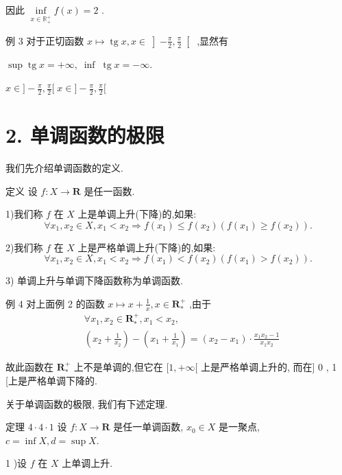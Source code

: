 因此 $\mathop{\inf }\limits_{{x \in  {\mathbb{R}}_{ + }^{ + }}}f\left( x\right)  = 2$ .

例 3 对于正切函数 $x \mapsto  \operatorname{tg}x,x \in  \left\rbrack  {-\frac{\pi }{2},\frac{\pi }{2}}\right\lbrack$ ,显然有

$\sup \operatorname{tg}x =  + \infty ,\;\inf \;\operatorname{tg}x =  - \infty .$

$x \in  \rbrack  - \frac{\pi }{2},\frac{\pi }{2}\lbrack \;x \in  \rbrack  - \frac{\pi }{2},\frac{\pi }{2}\lbrack$

\section*{2. 单调函数的极限}

我们先介绍单调函数的定义.

定义 设 $f : X \rightarrow  \mathbf{R}$ 是任一函数.

1)我们称 $f$ 在 $X$ 上是单调上升(下降)的,如果:
$$\forall {x}_{1},{x}_{2} \in  X,{x}_{1} < {x}_{2} \Rightarrow  f\left( {x}_{1}\right)  \leq  f\left( {x}_{2}\right) \left( {f\left( {x}_{1}\right)  \geq  f\left( {x}_{2}\right) }\right) .$$

2)我们称 $f$ 在 $X$ 上是严格单调上升(下降)的,如果:
$$\forall {x}_{1},{x}_{2} \in  X,{x}_{1} < {x}_{2} \Rightarrow  f\left( {x}_{1}\right)  < f\left( {x}_{2}\right) \left( {f\left( {x}_{1}\right)  > f\left( {x}_{2}\right) }\right) .$$

3) 单调上升与单调下降函数称为单调函数.

例 4 对上面例 2 的函数 $x \mapsto  x + \frac{1}{x},x \in  {\mathbf{R}}_{ * }^{ + }$ ,由于
\begin{align*}
	&\forall {x}_{1},{x}_{2} \in  {\mathbf{R}}_{ * }^{ + },{x}_{1} < {x}_{2},\\
	&\left( {{x}_{2} + \frac{1}{{x}_{2}}}\right)  - \left( {{x}_{1} + \frac{1}{{x}_{1}}}\right)  = \left( {{x}_{2} - {x}_{1}}\right)  \cdot  \frac{{x}_{1}{x}_{2} - 1}{{x}_{1}{x}_{2}}
\end{align*}

故此函数在 ${\mathbf{R}}_{ * }^{ + }$ 上不是单调的,但它在 $\lbrack 1, + \infty \lbrack$ 上是严格单调上升的, 而在] 0 , 1 [上是严格单调下降的.

关于单调函数的极限, 我们有下述定理.

定理 $4 \cdot  4 \cdot  1$ 设 $f : X \rightarrow  \mathbf{R}$ 是任一单调函数, ${x}_{0} \in  X$ 是一聚点, $c = \inf X,d = \sup X.$

1 )设 $f$ 在 $X$ 上单调上升.

